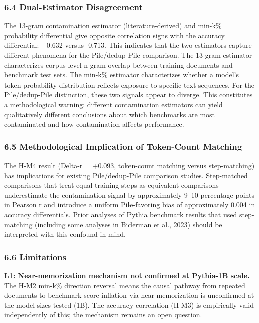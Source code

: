 \subsubsection{6.4 Dual-Estimator Disagreement}

The 13-gram contamination estimator (literature-derived) and min-k\% probability differential give opposite correlation signs with the accuracy differential: +0.632 versus -0.713. This indicates that the two estimators capture different phenomena for the Pile/dedup-Pile comparison. The 13-gram estimator characterizes corpus-level n-gram overlap between training documents and benchmark test sets. The min-k\% estimator characterizes whether a model's token probability distribution reflects exposure to specific text sequences. For the Pile/dedup-Pile distinction, these two signals appear to diverge. This constitutes a methodological warning: different contamination estimators can yield qualitatively different conclusions about which benchmarks are most contaminated and how contamination affects performance.

\subsubsection{6.5 Methodological Implication of Token-Count Matching}

The H-M4 result (Delta-r = +0.093, token-count matching versus step-matching) has implications for existing Pile/dedup-Pile comparison studies. Step-matched comparisons that treat equal training steps as equivalent comparisons underestimate the contamination signal by approximately 9--10 percentage points in Pearson r and introduce a uniform Pile-favoring bias of approximately 0.004 in accuracy differentials. Prior analyses of Pythia benchmark results that used step-matching (including some analyses in Biderman et al., 2023) should be interpreted with this confound in mind.

\subsubsection{6.6 Limitations}

\textbf{L1: Near-memorization mechanism not confirmed at Pythia-1B scale.} The H-M2 min-k\% direction reversal means the causal pathway from repeated documents to benchmark score inflation via near-memorization is unconfirmed at the model sizes tested (1B). The accuracy correlation (H-M3) is empirically valid independently of this; the mechanism remains an open question.

